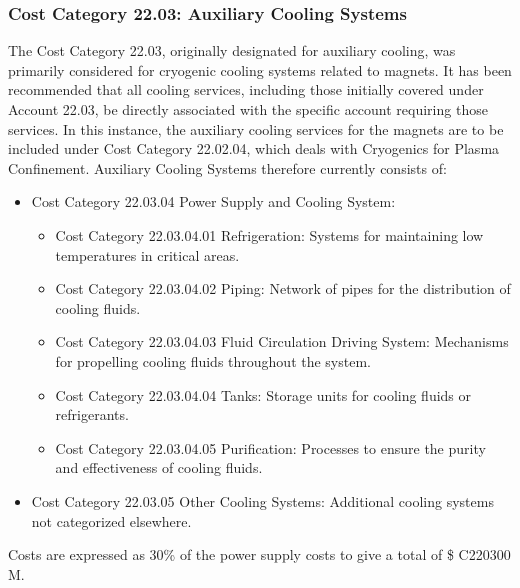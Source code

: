 
\subsubsection{Cost Category 22.03: Auxiliary Cooling Systems}

The Cost Category 22.03, originally designated for auxiliary cooling, was primarily considered for cryogenic cooling systems related to magnets. It has been recommended that all cooling services, including those initially covered under Account 22.03, be directly associated with the specific account requiring those services. In this instance, the auxiliary cooling services for the magnets are to be included under Cost Category 22.02.04, which deals with Cryogenics for Plasma Confinement. Auxiliary Cooling Systems therefore currently consists of:

\begin{itemize}
    \item Cost Category 22.03.04 Power Supply and Cooling System:
    \begin{itemize}
        \item Cost Category 22.03.04.01 Refrigeration: Systems for maintaining low temperatures in critical areas.
        \item Cost Category 22.03.04.02 Piping: Network of pipes for the distribution of cooling fluids.
        \item Cost Category 22.03.04.03 Fluid Circulation Driving System: Mechanisms for propelling cooling fluids throughout the system.
        \item Cost Category 22.03.04.04 Tanks: Storage units for cooling fluids or refrigerants.
        \item Cost Category 22.03.04.05 Purification: Processes to ensure the purity and effectiveness of cooling fluids.
    \end{itemize}
    \item Cost Category 22.03.05 Other Cooling Systems: Additional cooling systems not categorized elsewhere.
\end{itemize}

Costs are expressed as 30\% of the power supply costs to give a total of \$ C220300 M.